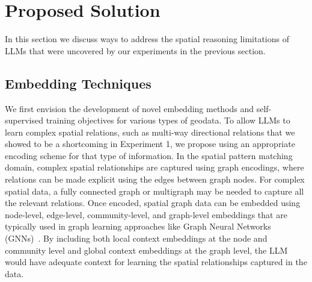 \section{Proposed Solution}
\label{section:proposal}

In this section we discuss ways to address the spatial reasoning limitations of LLMs that were uncovered by our experiments in the previous section.


\subsection{Embedding Techniques}
We first envision the development of novel embedding methods and self-supervised training objectives for various types of geodata.
%
%
To allow LLMs to learn complex spatial relations, such as multi-way directional relations that we showed to be a shortcoming in Experiment 1, we propose using an appropriate encoding scheme for that type of information.
In the spatial pattern matching domain, complex spatial relationships are captured using graph encodings, where relations can be made explicit using the edges between graph nodes.
For complex spatial data, a fully connected graph or multigraph may be needed to capture all the relevant relations. 
Once encoded, spatial graph data can be embedded using node-level, edge-level, community-level, and graph-level embeddings that are typically used in graph learning approaches like Graph Neural Networks (GNNs)~\cite{Bai2019,Krlevza2016,Liu2020Neural}.
By including both local context embeddings at the node and community level and global context embeddings at the graph level, the LLM would have adequate context for learning the spatial relationships captured in the data.


